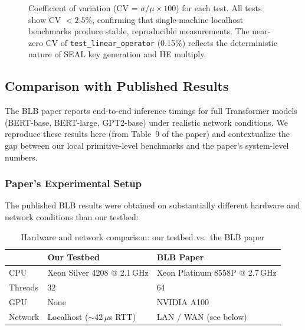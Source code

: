 \begin{figure}[ht]
\centering
{}
\caption{Coefficient of variation (CV = $\sigma / \mu \times 100$) for each test. All tests show CV $< 2.5$\%, confirming that single-machine localhost benchmarks produce stable, reproducible measurements. The near-zero CV of \texttt{test\_linear\_operator} (0.15\%) reflects the deterministic nature of SEAL key generation and HE multiply.}
\label{fig:cv-analysis}
\end{figure}

\subsection{Comparison with Published Results}\label{sec:comparison}

The BLB paper reports end-to-end inference timings for full Transformer models (BERT-base, BERT-large, GPT2-base) under realistic network conditions.
We reproduce these results here (from Table~9 of the paper) and contextualize the gap between our local primitive-level benchmarks and the paper's system-level numbers.

\subsubsection{Paper's Experimental Setup}

The published BLB results were obtained on substantially different hardware and network conditions than our testbed:

\begin{table}[ht]
\centering
\caption{Hardware and network comparison: our testbed vs.\ the BLB paper}
\label{tab:hw-comparison}
\begin{tabular}{lll}
\toprule
 & \textbf{Our Testbed} & \textbf{BLB Paper} \\
\midrule
CPU & Xeon Silver 4208 @ 2.1\,GHz & Xeon Platinum 8558P @ 2.7\,GHz \\
Threads & 32 & 64 \\
GPU & None & NVIDIA A100 \\
Network & Localhost ($\sim$42\,$\mu$s RTT) & LAN / WAN (see below) \\
\bottomrule
\end{tabular}
\end{table}

